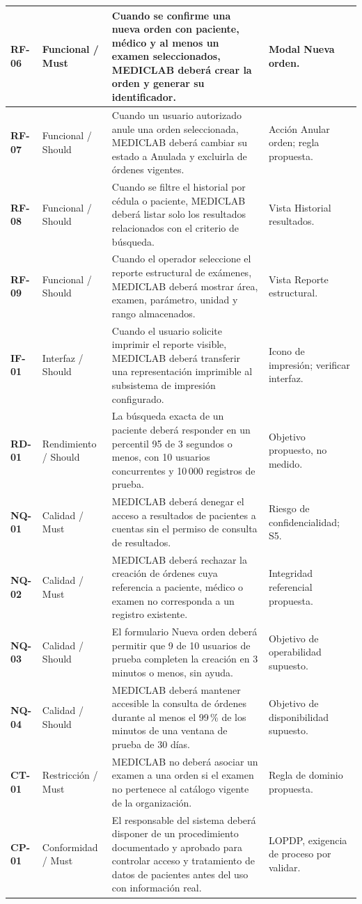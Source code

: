 \begin{longtable}{|p{1.3cm}|p{2.35cm}|p{7.3cm}|p{2.4cm}|}
\textbf{RF-06} & Funcional / Must & Cuando se confirme una nueva orden con paciente, médico y al menos un examen seleccionados, MEDICLAB deberá crear la orden y generar su identificador. & Modal Nueva orden.\\\hline
\textbf{RF-07} & Funcional / Should & Cuando un usuario autorizado anule una orden seleccionada, MEDICLAB deberá cambiar su estado a Anulada y excluirla de órdenes vigentes. & Acción Anular orden; regla propuesta.\\\hline
\textbf{RF-08} & Funcional / Should & Cuando se filtre el historial por cédula o paciente, MEDICLAB deberá listar solo los resultados relacionados con el criterio de búsqueda. & Vista Historial resultados.\\\hline
\textbf{RF-09} & Funcional / Should & Cuando el operador seleccione el reporte estructural de exámenes, MEDICLAB deberá mostrar área, examen, parámetro, unidad y rango almacenados. & Vista Reporte estructural.\\\hline
\textbf{IF-01} & Interfaz / Should & Cuando el usuario solicite imprimir el reporte visible, MEDICLAB deberá transferir una representación imprimible al subsistema de impresión configurado. & Icono de impresión; verificar interfaz.\\\hline
\textbf{RD-01} & Rendimiento / Should & La búsqueda exacta de un paciente deberá responder en un percentil 95 de 3 segundos o menos, con 10 usuarios concurrentes y 10\,000 registros de prueba. & Objetivo propuesto, no medido.\\\hline
\textbf{NQ-01} & Calidad / Must & MEDICLAB deberá denegar el acceso a resultados de pacientes a cuentas sin el permiso de consulta de resultados. & Riesgo de confidencialidad; S5.\\\hline
\textbf{NQ-02} & Calidad / Must & MEDICLAB deberá rechazar la creación de órdenes cuya referencia a paciente, médico o examen no corresponda a un registro existente. & Integridad referencial propuesta.\\\hline
\textbf{NQ-03} & Calidad / Should & El formulario Nueva orden deberá permitir que 9 de 10 usuarios de prueba completen la creación en 3 minutos o menos, sin ayuda. & Objetivo de operabilidad supuesto.\\\hline
\textbf{NQ-04} & Calidad / Should & MEDICLAB deberá mantener accesible la consulta de órdenes durante al menos el 99\,\% de los minutos de una ventana de prueba de 30 días. & Objetivo de disponibilidad supuesto.\\\hline
\textbf{CT-01} & Restricción / Must & MEDICLAB no deberá asociar un examen a una orden si el examen no pertenece al catálogo vigente de la organización. & Regla de dominio propuesta.\\\hline
\textbf{CP-01} & Conformidad / Must & El responsable del sistema deberá disponer de un procedimiento documentado y aprobado para controlar acceso y tratamiento de datos de pacientes antes del uso con información real. & LOPDP, exigencia de proceso por validar.\\\hline
\end{longtable}\endgroup


